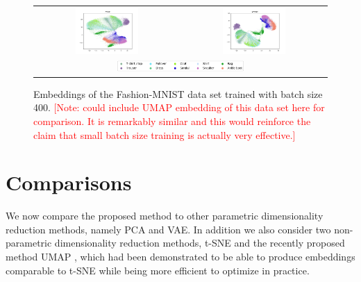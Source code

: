 \begin{figure}[!htb]
  \centering
  \begin{tabular}{cc}
    \includegraphics[width=0.45\textwidth]{images/fashion_mnist_ptsne_embedding.png} &
    \includegraphics[width=0.45\textwidth]{images/fashion_mnist_vptsne_embedding.png} \\
    \multicolumn{2}{c}{\includegraphics[width=0.45\textwidth]{images/fashion_mnist_legend.png}}
  \end{tabular}
  \caption{Embeddings of the Fashion-MNIST data set trained with batch size 400. \textcolor{red}{[Note: could include UMAP embedding of this data set here for comparison. It is remarkably similar and this would reinforce the claim that small batch size training is actually very effective.]}}
  \label{fig:fashion_mnist_comparison}
\end{figure}

\section{Comparisons}
\label{subsection:comparisons}

We now compare the proposed method to other parametric dimensionality reduction methods, namely PCA and VAE. In addition we also consider two non-parametric dimensionality reduction methods, t-SNE and the recently proposed method UMAP \citep{umap}, which had been demonstrated to be able to produce embeddings comparable to t-SNE while being more efficient to optimize in practice.

